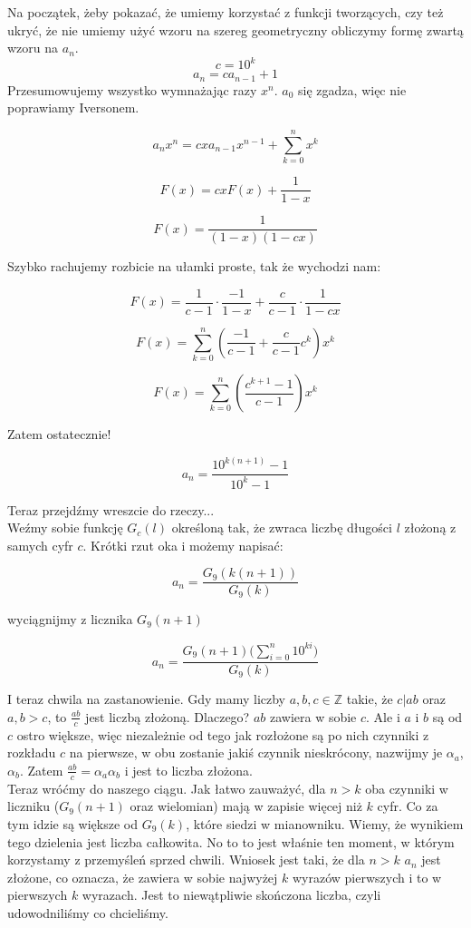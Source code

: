 \documentclass[a4paper,11pt]{article}
\begin{document}
Na początek, żeby pokazać, że umiemy korzystać z funkcji tworzących, czy też ukryć, że nie umiemy użyć wzoru na szereg geometryczny obliczymy formę zwartą wzoru na $a_n$.
\[
	c = 10^k
\]
\[
  a_{n} = c a_{n-1} + 1
\]
Przesumowujemy wszystko wymnażając razy $x^n$. $a_0$ się zgadza, więc nie poprawiamy Iversonem.

\[
  a_{n}x^{n} = c x a_{n-1} x^{n-1} + \sum_{k=0}^{n}{x^k}
\]

\[
  F(x) = cxF(x) + \frac{1}{1-x}
\]

\[
  F(x) = \frac{1}{(1-x)(1-cx)}
\]

Szybko rachujemy rozbicie na ułamki proste, tak że wychodzi nam:

\[
  F(x) = \frac{1}{c-1}\cdot\frac{-1}{1-x} + \frac{c}{c-1}\cdot\frac{1}{1-cx}
\]

\[
  F(x) = \sum_{k=0}^{n}{( \frac{-1}{c-1} + \frac{c}{c-1}c^k )x^k}
\]

\[
  F(x) = \sum_{k=0}^{n}{( \frac{c^{k+1} - 1}{c-1})x^k}
\]

Zatem ostatecznie!

\[
  a_{n} = \frac{10^{k(n+1)} - 1}{10^k-1}
\]

Teraz przejdźmy wreszcie do rzeczy... \\

Weźmy sobie funkcję $G_{c}(l)$ określoną tak, że zwraca liczbę długości $l$ złożoną z samych cyfr $c$. Krótki rzut oka i możemy napisać:

\[
  a_{n} = \frac{G_{9}(k(n+1))}{G_{9}(k)}
\]

wyciągnijmy z licznika $G_{9}(n+1)$

\[
  a_{n} = \frac{G_{9}(n+1)\big( \sum_{i=0}^{n}10^{ki} \big)}{G_{9}(k)}
\]

I teraz chwila na zastanowienie. Gdy mamy liczby $a, b, c \in \mathbb{Z}$ takie, że $c | ab$ oraz $a, b > c$, to $\frac{ab}{c}$ jest liczbą złożoną. Dlaczego? $ab$ zawiera w sobie $c$. Ale i $a$ i $b$ są od $c$ ostro większe, więc niezależnie od tego jak rozłożone są po nich czynniki z rozkładu $c$ na pierwsze, w obu zostanie jakiś czynnik nieskrócony, nazwijmy je $\alpha_a$, $\alpha_b$. Zatem $\frac{ab}{c} = \alpha_{a}\alpha_{b}$ i jest to liczba złożona. \\

Teraz wróćmy do naszego ciągu. Jak łatwo zauważyć, dla $n > k$ oba czynniki w liczniku ($G_{9}(n+1)$ oraz wielomian) mają w zapisie więcej niż $k$ cyfr. Co za tym idzie są większe od $G_{9}(k)$, które siedzi w mianowniku. Wiemy, że wynikiem tego dzielenia jest liczba całkowita. No to to jest właśnie ten moment, w którym korzystamy z przemyśleń sprzed chwili. Wniosek jest taki, że dla $n > k$ $a_{n}$ jest złożone, co oznacza, że zawiera w sobie najwyżej $k$ wyrazów pierwszych i to w pierwszych $k$ wyrazach. Jest to niewątpliwie skończona liczba, czyli udowodniliśmy co chcieliśmy.
\end{document}
